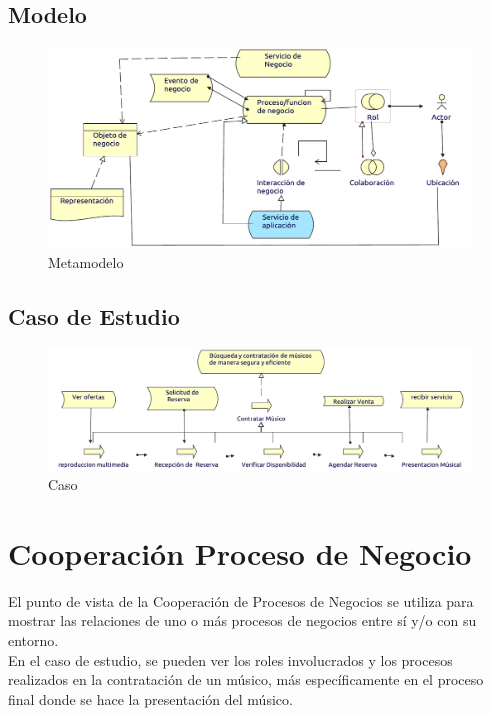 \subsection{Modelo}
\begin{figure}[h!]
	\centering
	\includegraphics[width=\linewidth]{Arquitectura/Negocio/imgs/ProcesoNegocioMetamodelo.pdf}
	\caption{Metamodelo}
\end{figure}
\newpage
\subsection{Caso de Estudio}

\begin{figure}[h!]
	\centering
	\includegraphics[width=\linewidth]{Arquitectura/Negocio/imgs/ProcesoNegocio.pdf}
	\caption{Caso}
\end{figure}
\newpage

\section{Cooperación Proceso de Negocio}
El punto de vista de la Cooperación de Procesos de Negocios se utiliza para mostrar las relaciones de uno o más procesos de negocios entre sí y/o con su entorno. \\

En el caso de estudio, se pueden ver los roles involucrados y los procesos realizados en la contratación de un músico, más específicamente en el proceso final donde se hace la presentación del músico.
